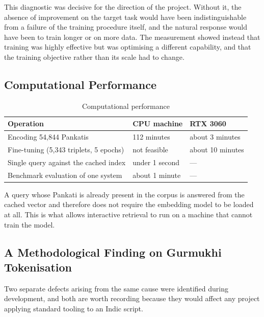 \documentclass[12pt,a4paper]{article}
\begin{document}
\vspace{0.3cm}

This diagnostic was decisive for the direction of the project. Without it, the absence of improvement on the target task would have been indistinguishable from a failure of the training procedure itself, and the natural response would have been to train longer or on more data. The measurement showed instead that training was highly effective but was optimising a different capability, and that the training objective rather than its scale had to change.

\subsection{Computational Performance}

\begin{table}[H]
\centering
\renewcommand{\arraystretch}{1.3}
\caption{Computational performance}
\begin{tabular}{|p{6.4cm}|p{3.3cm}|p{3.3cm}|}
\hline
\textbf{Operation} & \textbf{CPU machine} & \textbf{RTX 3060} \\
\hline
Encoding 54,844 Pankatis & 112 minutes & about 3 minutes \\
\hline
Fine-tuning (5,343 triplets, 5 epochs) & not feasible & about 10 minutes \\
\hline
Single query against the cached index & under 1 second & --- \\
\hline
Benchmark evaluation of one system & about 1 minute & --- \\
\hline
\end{tabular}
\end{table}

\vspace{0.3cm}

A query whose Pankati is already present in the corpus is answered from the cached vector and therefore does not require the embedding model to be loaded at all. This is what allows interactive retrieval to run on a machine that cannot train the model.

\subsection{A Methodological Finding on Gurmukhi Tokenisation}

Two separate defects arising from the same cause were identified during development, and both are worth recording because they would affect any project applying standard tooling to an Indic script.
\end{document}
